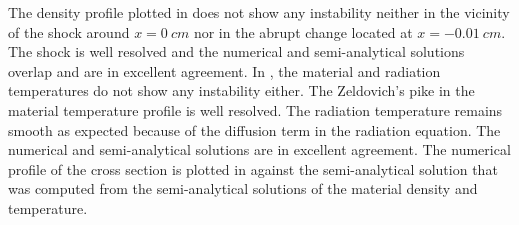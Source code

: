 \documentclass[times,doublespace]{fldauth}%
\begin{document}
%
The density profile plotted in  does not show any instability neither in the vicinity of the shock around $x = 0 \ cm$ nor in the abrupt change located at $x = -0.01 \ cm$. The shock is well resolved and the numerical and semi-analytical solutions overlap and are in excellent agreement.
%
%
In , the material and radiation temperatures do not show any instability either. The Zeldovich's pike in the material temperature profile is well resolved. The radiation temperature remains smooth as expected because of the diffusion term in the radiation equation. The numerical and semi-analytical solutions are in excellent agreement. 
%
%
The numerical profile of the cross section is plotted in  against the semi-analytical solution that was computed from the semi-analytical solutions of the material density and temperature. 
%
\end{document}
